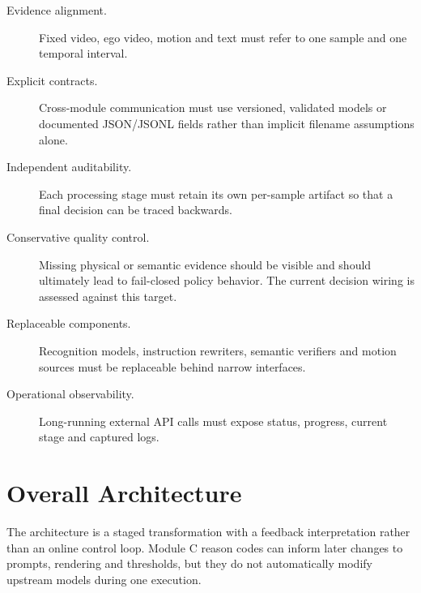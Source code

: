\documentclass[11pt,oneside]{report}
\begin{document}
\begin{description}
    \item[Evidence alignment.] Fixed video, ego video, motion and text must refer
    to one sample and one temporal interval.
    \item[Explicit contracts.] Cross-module communication must use versioned,
    validated models or documented JSON/JSONL fields rather than implicit
    filename assumptions alone.
    \item[Independent auditability.] Each processing stage must retain its own
    per-sample artifact so that a final decision can be traced backwards.
    \item[Conservative quality control.] Missing physical or semantic evidence
    should be visible and should ultimately lead to fail-closed policy behavior.
    The current decision wiring is assessed against this target.
    \item[Replaceable components.] Recognition models, instruction rewriters,
    semantic verifiers and motion sources must be replaceable behind narrow
    interfaces.
    \item[Operational observability.] Long-running external API calls must expose
    status, progress, current stage and captured logs.
\end{description}

\section{Overall Architecture}
The architecture is a staged transformation with a feedback interpretation
rather than an online control loop. Module C reason codes can inform later
changes to prompts, rendering and thresholds, but they do not automatically
modify upstream models during one execution.
\end{document}
